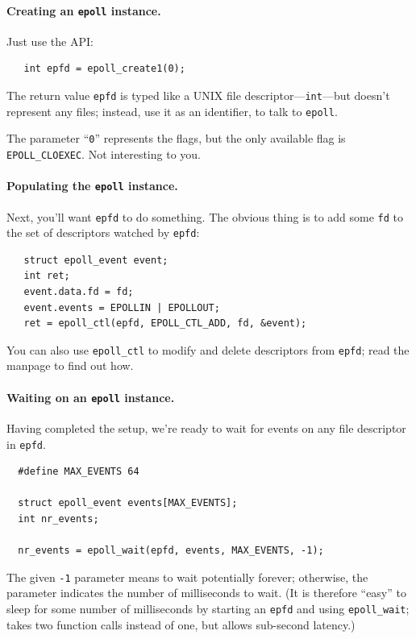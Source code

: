 \documentclass[11pt]{article}
\begin{document}
\paragraph{Creating an {\tt epoll} instance.} Just use the API:
    \begin{lstlisting}
   int epfd = epoll_create1(0);
    \end{lstlisting}

The return value {\tt epfd} is typed like a UNIX file
descriptor---{\tt int}---but doesn't represent any files; instead, use
it as an identifier, to talk to {\tt epoll}.

The parameter ``{\tt 0}'' represents the flags, but the only available flag
is {\tt EPOLL\_CLOEXEC}. Not interesting to you.

\paragraph{Populating the {\tt epoll} instance.} Next, you'll want
{\tt epfd} to do something. The obvious thing is to add some {\tt fd}
to the set of descriptors watched by {\tt epfd}:
    \begin{lstlisting}
   struct epoll_event event;
   int ret;
   event.data.fd = fd;
   event.events = EPOLLIN | EPOLLOUT;
   ret = epoll_ctl(epfd, EPOLL_CTL_ADD, fd, &event);
    \end{lstlisting}

You can also use {\tt epoll\_ctl} to modify and delete descriptors from {\tt epfd}; read the manpage to find out how.

\paragraph{Waiting on an {\tt epoll} instance.} Having completed
the setup, we're ready to wait for events on any file descriptor in {\tt epfd}.
    \begin{lstlisting}
  #define MAX_EVENTS 64

  struct epoll_event events[MAX_EVENTS];
  int nr_events;

  nr_events = epoll_wait(epfd, events, MAX_EVENTS, -1);
    \end{lstlisting}

The given {\tt -1} parameter means to wait potentially forever;
otherwise, the parameter indicates the number of milliseconds to wait.
(It is therefore ``easy'' to sleep for some number of milliseconds by
starting an {\tt epfd} and using {\tt epoll\_wait}; takes two function
calls instead of one, but allows sub-second latency.)
\end{document}
